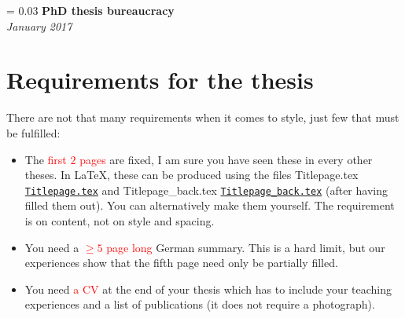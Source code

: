 \documentclass[a4paper]{article}
\newlength{\titleVerticalSpacing}
\newcommand{\myTitle}[2]{%
    \begingroup
        \titleVerticalSpacing = 0.03\textheight
        \centering
        \vspace*{\titleVerticalSpacing}
        {\Huge\bfseries #1}\\[\baselineskip]
        {\itshape #2}\\[3\baselineskip]
    \endgroup
}
\newcommand{\attention}[1]{\textcolor{red}{#1}}
\newcommand{\file}[2][]{%
    \ifthenelse{\isempty{#1}}%
        {\textcolor{fileColor}{#2}}%
        {\href{run:#1}{\texttt{\textcolor{fileColor}{#2}}}}%
}
\begin{document}
    
    \myTitle{PhD thesis bureaucracy}{January 2017}

    \section*{Requirements for the thesis}
        There are not that many requirements when it comes to style, just few that must be fulfilled:
        \begin{itemize}
            \item The \attention{first $2$ pages} are fixed, I am sure you have seen these in every other theses.
                  In \LaTeX, these can be produced using the files \file{Titlepage.tex} and \file{Titlepage\_back.tex} (after having filled them out).
                  You can alternatively make them yourself. The requirement is on content, not on style and spacing.
            \item You need a \attention{$\geq 5$ page long} German summary. This is a hard limit, but our experiences show that the fifth page need
              only be partially filled.
            \item You need \attention{a CV} at the end of your thesis which has to include your teaching experiences and a list of publications
              (it does not require a photograph).
        \end{itemize}
        
        
\end{document}
